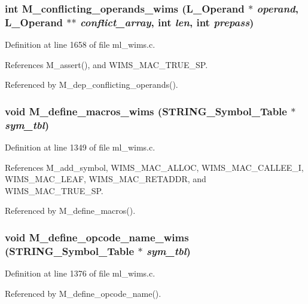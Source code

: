 \subsubsection{\setlength{\rightskip}{0pt plus 5cm}int M\_\-conflicting\_\-operands\_\-wims (L\_\-Operand $\ast$ {\em operand}, L\_\-Operand $\ast$$\ast$ {\em conflict\_\-array}, int {\em len}, int {\em prepass})}\label{ml__wims_8c_79887eb474ee939c6542081d64a9c520}




Definition at line 1658 of file ml\_\-wims.c.

References M\_\-assert(), and WIMS\_\-MAC\_\-TRUE\_\-SP.

Referenced by M\_\-dep\_\-conflicting\_\-operands().
\subsubsection{\setlength{\rightskip}{0pt plus 5cm}void M\_\-define\_\-macros\_\-wims (\bf{STRING\_\-Symbol\_\-Table} $\ast$ {\em sym\_\-tbl})}\label{ml__wims_8c_5e1c8e632e72f22aa891e7d808aa77b4}




Definition at line 1349 of file ml\_\-wims.c.

References M\_\-add\_\-symbol, WIMS\_\-MAC\_\-ALLOC, WIMS\_\-MAC\_\-CALLEE\_\-I, WIMS\_\-MAC\_\-LEAF, WIMS\_\-MAC\_\-RETADDR, and WIMS\_\-MAC\_\-TRUE\_\-SP.

Referenced by M\_\-define\_\-macros().
\subsubsection{\setlength{\rightskip}{0pt plus 5cm}void M\_\-define\_\-opcode\_\-name\_\-wims (\bf{STRING\_\-Symbol\_\-Table} $\ast$ {\em sym\_\-tbl})}\label{ml__wims_8c_0e78c613c5ab154c04604c59340153d4}




Definition at line 1376 of file ml\_\-wims.c.

Referenced by M\_\-define\_\-opcode\_\-name().
